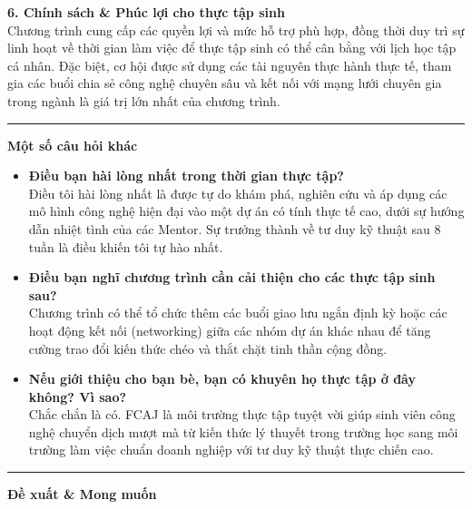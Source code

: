 \textbf{6. Chính sách \& Phúc lợi cho thực tập sinh}\\
Chương trình cung cấp các quyền lợi và mức hỗ trợ phù hợp, đồng thời duy
trì sự linh hoạt về thời gian làm việc để thực tập sinh có thể cân bằng
với lịch học tập cá nhân. Đặc biệt, cơ hội được sử dụng các tài nguyên
thực hành thực tế, tham gia các buổi chia sẻ công nghệ chuyên sâu và kết
nối với mạng lưới chuyên gia trong ngành là giá trị lớn nhất của chương
trình.

\begin{center}\rule{0.5\linewidth}{0.5pt}\end{center}

\vspace{0.5em}\noindent\textbf{Một số câu hỏi khác}

\begin{itemize}
\item
  \textbf{Điều bạn hài lòng nhất trong thời gian thực tập?}\\
  Điều tôi hài lòng nhất là được tự do khám phá, nghiên cứu và áp dụng
  các mô hình công nghệ hiện đại vào một dự án có tính thực tế cao, dưới
  sự hướng dẫn nhiệt tình của các Mentor. Sự trưởng thành về tư duy kỹ
  thuật sau 8 tuần là điều khiến tôi tự hào nhất.
\item
  \textbf{Điều bạn nghĩ chương trình cần cải thiện cho các thực tập sinh
  sau?}\\
  Chương trình có thể tổ chức thêm các buổi giao lưu ngắn định kỳ hoặc
  các hoạt động kết nối (networking) giữa các nhóm dự án khác nhau để
  tăng cường trao đổi kiến thức chéo và thắt chặt tinh thần cộng đồng.
\item
  \textbf{Nếu giới thiệu cho bạn bè, bạn có khuyên họ thực tập ở đây
  không? Vì sao?}\\
  Chắc chắn là có. FCAJ là môi trường thực tập tuyệt vời giúp sinh viên
  công nghệ chuyển dịch mượt mà từ kiến thức lý thuyết trong trường học
  sang môi trường làm việc chuẩn doanh nghiệp với tư duy kỹ thuật thực
  chiến cao.
\end{itemize}

\begin{center}\rule{0.5\linewidth}{0.5pt}\end{center}

\vspace{0.5em}\noindent\textbf{Đề xuất \& Mong muốn}

